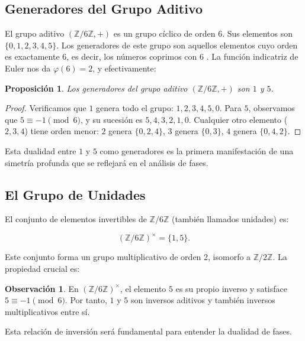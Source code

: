 \documentclass[12pt,a4paper]{article}
\theoremstyle{plain}
\newtheorem{proposicion}[teorema]{Proposición}
\theoremstyle{definition}
\newtheorem{observacion}[teorema]{Observación}
\theoremstyle{remark}
\begin{document}
\subsection{Generadores del Grupo Aditivo}

El grupo aditivo $(\mathbb{Z}/6\mathbb{Z}, +)$ es un grupo cíclico de orden 6. Sus elementos son $\{0,1,2,3,4,5\}$. Los generadores de este grupo son aquellos elementos cuyo orden es exactamente 6, es decir, los números coprimos con 6 \cite{campos2007}. La función indicatriz de Euler nos da $\varphi(6) = 2$, y efectivamente:

\begin{proposicion}
Los generadores del grupo aditivo $(\mathbb{Z}/6\mathbb{Z}, +)$ son $1$ y $5$.
\end{proposicion}

\begin{proof}
Verificamos que $1$ genera todo el grupo: $1, 2, 3, 4, 5, 0$. Para $5$, observamos que $5 \equiv -1 \pmod{6}$, y su sucesión es $5, 4, 3, 2, 1, 0$. Cualquier otro elemento ($2,3,4$) tiene orden menor: $2$ genera $\{0,2,4\}$, $3$ genera $\{0,3\}$, $4$ genera $\{0,4,2\}$.
\end{proof}

Esta dualidad entre $1$ y $5$ como generadores es la primera manifestación de una simetría profunda que se reflejará en el análisis de fases.

\subsection{El Grupo de Unidades}

El conjunto de elementos invertibles de $\mathbb{Z}/6\mathbb{Z}$ (también llamados unidades) es:

\begin{equation}
(\mathbb{Z}/6\mathbb{Z})^{\times} = \{1,5\}.
\end{equation}

Este conjunto forma un grupo multiplicativo de orden 2, isomorfo a $\mathbb{Z}/2\mathbb{Z}$. La propiedad crucial es:

\begin{observacion}
En $(\mathbb{Z}/6\mathbb{Z})^{\times}$, el elemento $5$ es su propio inverso y satisface $5 \equiv -1 \pmod{6}$. Por tanto, $1$ y $5$ son inversos aditivos y también inversos multiplicativos entre sí.
\end{observacion}

Esta relación de inversión será fundamental para entender la dualidad de fases.
\end{document}
